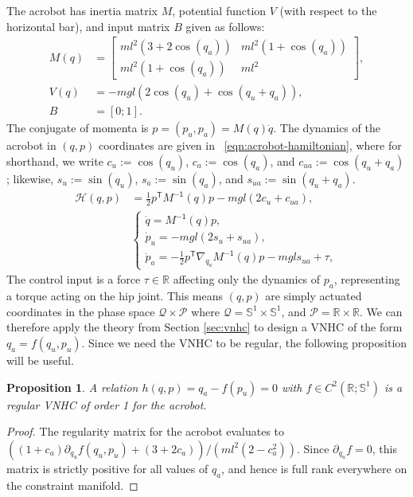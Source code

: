 \documentclass[journal,twoside,web]{ieeecolor}
\newtheorem{prop}[thm]{Proposition} %
\newcommand*{\tpose}{^\mathsf{T}}
\newcommand*{\R}{\mathbb{R}}
\newcommand*{\Sone}{\mathbb{S}^1}
\newcommand*{\Minv}{M^\mathsf{-1}}
\begin{document}
The acrobot has inertia matrix 
\(M\), potential function \(V\) (with respect to
the horizontal bar), and input matrix \(B\) given as follows:
\begin{align}\label{eqn:acrobot-inertia}
    M(q) &= \begin{bmatrix}
        ml^2\left(3+2\cos(q_a)\right) & 
        ml^2\left(1+\cos(q_a)\right) \\
        ml^2\left(1+\cos(q_a)\right) &
        ml^2
    \end{bmatrix} 
    , \\
    \label{eqn:acrobot-potential}
    V(q) &= -mgl\left(2\cos(q_u)+\cos(q_u+q_a)\right)
    , \\
    \label{eqn:acrobot-B}
    B &= [0;1]
    .
\end{align}
The conjugate of momenta is \(p = (p_u,p_a) = M(q)\dot{q}\).
The dynamics of the acrobot in \((q,p)\) coordinates are given in
~\eqref{eqn:acrobot-hamiltonian}, where
for shorthand, we write \(c_u := \cos(q_u)\), \(c_a := \cos(q_a)\), and 
\(c_{ua} := \cos(q_u + q_a)\); likewise, \(s_u := \sin(q_u)\), 
\(s_a := \sin(q_a)\), and \(s_{ua} := \sin(q_u + q_a)\).
\begin{align}\label{eqn:acrobot-hamiltonian}
    \mathcal{H}(q,p) &= \frac{1}{2}p\tpose \Minv(q) p -
    mgl\left(2 c_u + c_{ua}\right)
    , \\
     &\begin{cases}
        \dot{q} = \Minv(q) p 
        ,\\
        \dot{p}_u = -mgl\left(2s_u + s_{ua}\right) 
        ,\\
        \dot{p}_a =-\frac{1}{2}p\tpose \nabla_{q_a}\Minv(q) p
        - mgl s_{ua} + \tau,
    \end{cases} \nonumber
\end{align}
The control input is a force \(\tau \in \R\) affecting only the dynamics of
\(p_a\), representing a torque acting on the hip joint.
This means \((q,p)\) are simply actuated coordinates in the phase space
\(\mathcal{Q} \times \mathcal{P}\) where
\(\mathcal{Q} = \Sone \times \Sone\), and
\(\mathcal{P} = \R \times \R\).
We can therefore apply the theory from Section \ref{sec:vnhc} to design
a VNHC of the form \(q_a = f(q_u,p_u)\). 
Since we need the VNHC to be regular, the following proposition will be
useful.
\begin{prop}\label{prop:acrobot-fpu-regular}
    A relation \(h(q,p) = q_a - f(p_u) = 0\) 
    with \(f \in C^2\left(\R; \Sone\right)\) is a regular
    VNHC of order 1 for the acrobot.
\end{prop}
\begin{proof}
    The regularity matrix for the acrobot evaluates to
    \(((1+c_a)\partial_{q_u}f(q_u,p_u) + (3+2c_a))/(ml^2(2-c_a^2))\).
    Since \(\partial_{q_u} f = 0\), this matrix is strictly positive for all values
    of \(q_a\), and hence is full rank everywhere on the constraint manifold.
\end{proof}
\end{document}
